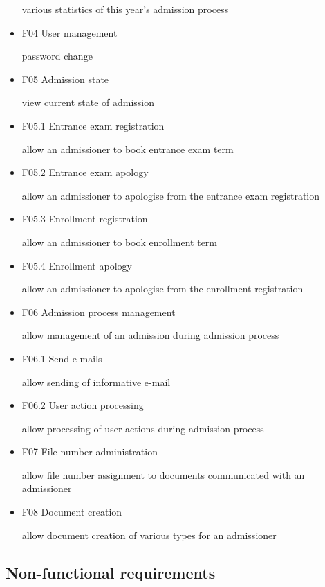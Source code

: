 \begin{itemize}
		various statistics of this year's admission process
	
		\item F04 User management
	
		password change
	
		\item F05 Admission state
	
		view current state of admission
		
		\item F05.1 Entrance exam registration
		
		allow an admissioner to book entrance exam term
		
		\item F05.2 Entrance exam apology
		
		allow an admissioner to apologise from the entrance exam registration
		
		\item F05.3 Enrollment registration
		
		allow an admissioner to book enrollment term
		
		\item F05.4 Enrollment apology
		
		allow an admissioner to apologise from the enrollment registration
		
		\item F06 Admission process management
		
		allow management of an admission during admission process
		
		\item F06.1 Send e-mails
		
		allow sending of informative e-mail
		
		\item F06.2 User action processing
		
		allow processing of user actions during admission process
		
		\item F07 File number administration
		
		allow file number assignment to documents communicated with an admissioner
		
		\item F08 Document creation
		
		allow document creation of various types for an admissioner 
	\end{itemize}
	
	\subsection{Non-functional requirements}
	
